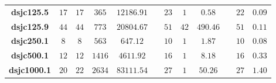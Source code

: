 \documentclass[12pt,a4paper]{article}
\begin{document}
\begin{table}[!htb]
\begin{tabular}{cc|cccccccccc}
\textbf{dsjc125.5} & $17$ & $17$ & $365$ & $12186.91$ &  & $23$ & $1$ & $0.58$ & & $22$ & $0.09$\\

\textbf{dsjc125.9} & $44$ & $44$ & $773$ & $20804.67$ &  & $51$ & $42$ & $490.46$  & & $51$ & $0.11$\\

\textbf{dsjc250.1} & $8$ & $8$ & $563$ & $647.12$ &  & $10$ & $1$ & $1.87$ & & $10$ & $0.08$\\

\textbf{dsjc500.1} & $12$ & $12$ & $1416$ & $4611.92$ &  & $16$ & $1$ & $8.18$ & & $16$ & $0.33$\\


\textbf{dsjc1000.1} & $20$ & $22$ & $2634$ & $83111.54$ &  & $27$ & $1$ & $50.26$ & & $27$ & $1.40$\\

\bottomrule
\end{tabular}
\vspace{-.5cm}
\end{table}
\end{document}
